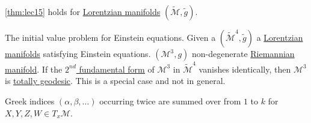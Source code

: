 \begin{note}
	\autoref{thm:lec15} holds for \hyperref[def:Lorentzian]{Lorentzian manifolds} \((\widetilde{\mathcal{M}} , \widetilde{g} )\).
\end{note}

\begin{eg}
	The initial value problem for Einstein equations. Given a \((\widetilde{\mathcal{M}} ^4, \widetilde{g} )\) a \hyperref[def:Lorentzian]{Lorentzian manifolds} satisfying Einstein equations. \((\mathcal{M} ^3, g)\) non-degenerate \hyperref[def:Riemannian-manifold]{Riemannian manifold}. If the \hyperref[def:2nd-fundamental-form]{\(2^{nd} \) fundamental form} of \(\mathcal{M} ^3\) in \(\widetilde{\mathcal{M}} ^4\) vanishes identically, then \(\mathcal{M} ^3\) is \hyperref[def:totally-geodesic]{totally geodesic}. This is a special case and not in general.
\end{eg}

\begin{notation}
	Greek indices \((\alpha , \beta , \ldots )\) occurring twice are summed over from \(1\) to \(k\) for \(X, Y, Z, W \in T_x \mathcal{M} \).
\end{notation}

